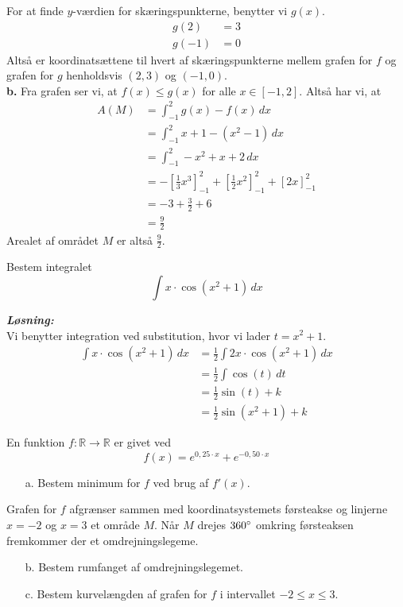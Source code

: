 \documentclass{article}
\newcommand{\sol}{\setlength{\parindent}{0cm}\textbf{\textit{Løsning:}}\setlength{\parindent}{1cm}}
\begin{document}
For at finde $y$-værdien for skæringspunkterne, benytter vi $g(x)$. 
\begin{equation*}
\begin{split}
  g(2)&=3\\ 
  g(-1)&=0
\end{split}
\end{equation*}
Altså er koordinatsættene til hvert af skæringspunkterne mellem grafen for $f$ og grafen for $g$ henholdsvis $(2,3)$ og $(-1,0)$. \\[1ex]
\textbf{b.}
Fra grafen ser vi, at $f(x)\leq g(x)$ for alle $x \in [-1,2]$.
Altså har vi, at
\begin{equation*}
\begin{split}
  A(M)&=\int_{-1}^{2} g(x)-f(x) \,dx \\ 
  &=\int_{-1}^{2} x+1-(x^2-1) \,dx\\ 
  &=\int_{-1}^{2} -x^2 +x+2\,dx \\ 
  &=-\left[\frac{1}{3}x^3\right]_{-1}^2+\left[\frac{1}{2}x^2\right]_{-1}^2 + \left[2x\right]_{-1}^2\\ 
  &=-3+\frac{3}{2}+6\\ 
  &=\frac{9}{2}
\end{split}
\end{equation*}
Arealet af området $M$ er altså $\frac{9}{2}$.
\begin{question}{}{}
  Bestem integralet
  \[
  \int x \cdot \cos(x^2+1) \,dx 
  \] 
\end{question}
\sol \\
Vi benytter integration ved substitution, hvor vi lader $t=x^2+1$.
\begin{equation*}
\begin{split}
  \int x \cdot \cos(x^2+1) \,dx &= \frac{1}{2} \int 2x \cdot \cos(x^2+1) \,dx \\ 
  &=\frac{1}{2} \int \cos(t) \,dt\\ 
  &=\frac{1}{2} \sin(t)+k\\ 
  &=\frac{1}{2} \sin(x^2+1)+k
\end{split}
\end{equation*}
\begin{question}{}{}
  En funktion $f:\mathbb{R}\to \mathbb{R}$ er givet ved
  \[
  f(x)= e^{0,25 \cdot x}+ e^{-0,50 \cdot x}
  \] 
  \begin{itemize}
    \item[a.] Bestem minimum for $f$ ved brug af $f'(x)$. 
  \end{itemize}
  Grafen for $f$ afgrænser sammen med koordinatsystemets førsteakse og linjerne $x=-2$ og $x=3$ et område $M$. 
  Når $M$ drejes $360 \degree $ omkring førsteaksen fremkommer der et omdrejningslegeme. 
  \begin{itemize}
    \item[b.] Bestem rumfanget af omdrejningslegemet.
    \item[c.] Bestem kurvelængden af grafen for $f$ i intervallet $-2\leq x \leq 3$.
  \end{itemize}
\end{question}
\end{document}
